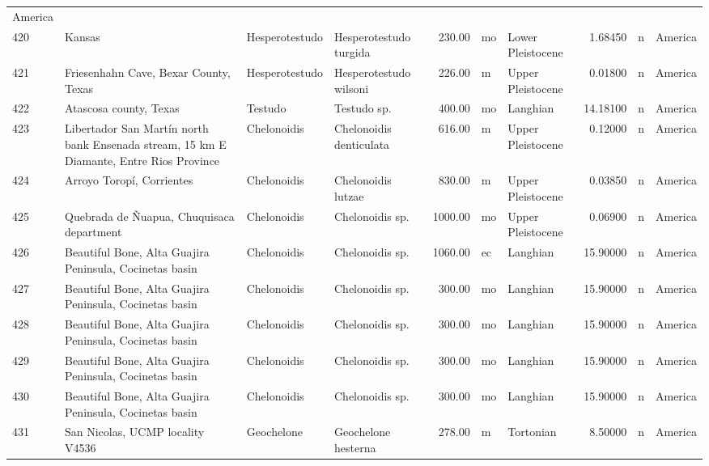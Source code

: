 \documentclass[]{article}
\begin{document}
\begin{longtable}[]{@{}llllrllrll@{}}
America\tabularnewline
420 & Kansas & Hesperotestudo & Hesperotestudo turgida & 230.00 & mo &
Lower Pleistocene & 1.68450 & n & America\tabularnewline
421 & Friesenhahn Cave, Bexar County, Texas & Hesperotestudo &
Hesperotestudo wilsoni & 226.00 & m & Upper Pleistocene & 0.01800 & n &
America\tabularnewline
422 & Atascosa county, Texas & Testudo & Testudo sp. & 400.00 & mo &
Langhian & 14.18100 & n & America\tabularnewline
423 & Libertador San Martín north bank Ensenada stream, 15 km E
Diamante, Entre Rios Province & Chelonoidis & Chelonoidis denticulata &
616.00 & m & Upper Pleistocene & 0.12000 & n & America\tabularnewline
424 & Arroyo Toropí, Corrientes & Chelonoidis & Chelonoidis lutzae &
830.00 & m & Upper Pleistocene & 0.03850 & n & America\tabularnewline
425 & Quebrada de Ñuapua, Chuquisaca department & Chelonoidis &
Chelonoidis sp. & 1000.00 & mo & Upper Pleistocene & 0.06900 & n &
America\tabularnewline
426 & Beautiful Bone, Alta Guajira Peninsula, Cocinetas basin &
Chelonoidis & Chelonoidis sp. & 1060.00 & ec & Langhian & 15.90000 & n &
America\tabularnewline
427 & Beautiful Bone, Alta Guajira Peninsula, Cocinetas basin &
Chelonoidis & Chelonoidis sp. & 300.00 & mo & Langhian & 15.90000 & n &
America\tabularnewline
428 & Beautiful Bone, Alta Guajira Peninsula, Cocinetas basin &
Chelonoidis & Chelonoidis sp. & 300.00 & mo & Langhian & 15.90000 & n &
America\tabularnewline
429 & Beautiful Bone, Alta Guajira Peninsula, Cocinetas basin &
Chelonoidis & Chelonoidis sp. & 300.00 & mo & Langhian & 15.90000 & n &
America\tabularnewline
430 & Beautiful Bone, Alta Guajira Peninsula, Cocinetas basin &
Chelonoidis & Chelonoidis sp. & 300.00 & mo & Langhian & 15.90000 & n &
America\tabularnewline
431 & San Nicolas, UCMP locality V4536 & Geochelone & Geochelone
hesterna & 278.00 & m & Tortonian & 8.50000 & n & America\tabularnewline
\bottomrule
\end{longtable}
\end{document}
